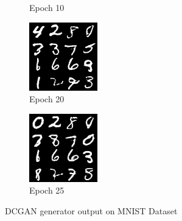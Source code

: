 \documentclass{article}
\begin{document}
\begin{figure}[H]
\begin{subfigure}{.125\textwidth}
        \caption{Epoch 10}
    \end{subfigure}%
    \begin{subfigure}{.125\textwidth}
        \centering
        \includegraphics[width=.9\linewidth]{GAN_epoch020.png}
        \caption{Epoch 20}
    \end{subfigure}%
    \begin{subfigure}{.125\textwidth}
        \centering
        \includegraphics[width=.9\linewidth]{GAN_epoch025.png}
        \caption{Epoch 25}
    \end{subfigure}
    \caption{DCGAN generator output on MNIST Dataset}
    \label{fig:my_label}
\end{figure}
\end{document}
